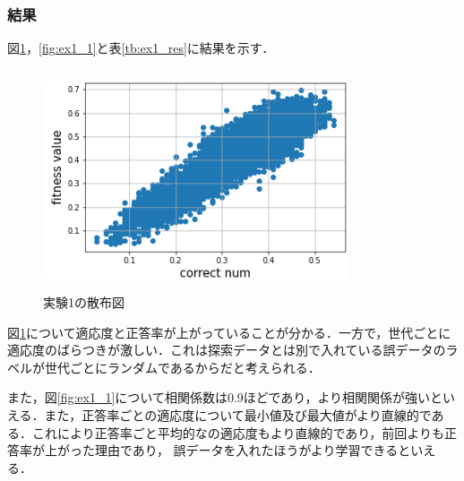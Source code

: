\documentclass[twocolumn]{jarticle}     %
\begin{document}
\subsubsection{結果}
図\ref{fig:ex1_2}，\ref{fig:ex1_1}と表\ref{tb:ex1_res}に結果を示す．
\begin{figure}[h]
	\begin{center}
		\includegraphics[height=65mm,width=90mm]{ex1_scat.png}
		\caption{実験1の散布図\label{fig:ex1_2}}
	\end{center}
\end{figure}

\begin{table}[h]
	\centering
	\caption{実験1の結果\label{tb:ex1_res}}
\end{table}

図\ref{fig:ex1_2}について適応度と正答率が上がっていることが分かる．一方で，世代ごとに適応度のばらつきが激しい．これは探索データとは別で入れている誤データのラベルが世代ごとにランダムであるからだと考えられる．

また，図\ref{fig:ex1_1}について相関係数は0.9ほどであり，より相関関係が強いといえる．また，正答率ごとの適応度について最小値及び最大値がより直線的である．これにより正答率ごと平均的なの適応度もより直線的であり，前回よりも正答率が上がった理由であり，
誤データを入れたほうがより学習できるといえる．
\end{document}
